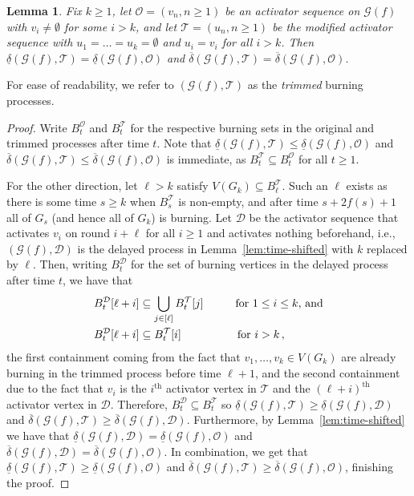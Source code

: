 \documentclass[12pt]{article}
\newtheorem{lemma}[theorem]{Lemma}
\theoremstyle{remark}
\newcommand\cD{\mathcal D}
\newcommand\cG{\mathcal G}
\newcommand\cO{\mathcal O}
\newcommand\cT{{\mathcal T}}
\newcommand{\ith}[1]{#1^{\text{th}}}
\begin{document}
\begin{lemma}\label{lem:turn1}
Fix $k \geq 1$, let $\cO = (v_n, n \geq 1)$ be an activator sequence on $\cG(f)$ with $v_i \ne \emptyset$ for some $i>k$, and let $\cT = (u_n, n \geq 1)$ be the modified activator sequence with $u_1 = \dots = u_k = \emptyset$ and $u_i = v_i$ for all $i > k$. Then $\underline{\delta}(\cG(f),\cT) = \underline{\delta}(\cG(f),\cO)$ and $\overline{\delta}(\cG(f),\cT) = \overline{\delta}(\cG(f),\cO)$.
\end{lemma}

For ease of readability, we refer to $(\cG(f), \cT)$ as the \emph{trimmed} burning processes.  

\begin{proof}
Write $B^{\cO}_t$ and $B^{\cT}_t$ for the respective burning sets in the original and trimmed processes after time $t$. Note that $\underline{\delta}(\cG(f),\cT) \leq \underline{\delta}(\cG(f),\cO)$ and $\overline{\delta}(\cG(f),\cT) \leq \overline{\delta}(\cG(f),\cO)$ is immediate, as $B^{\cT}_t \subseteq B^{\cO}_t$ for all $t \geq 1$. 

For the other direction, let $\ell > k$ satisfy $V(G_k) \subseteq B^{\cT}_\ell$. Such an $\ell$ exists as there is some time $s \geq k$ when $B^{\cT}_s$ is non-empty, and after time $s+2f(s)+1$ all of $G_s$ (and hence all of $G_k$) is burning. Let $\cD$ be the activator sequence that activates $v_i$ on round $i+\ell$ for all $i \geq 1$ and activates nothing beforehand, i.e., $(\cG(f), \cD)$ is the delayed process in Lemma~\ref{lem:time-shifted} with $k$ replaced by $\ell$. Then, writing $B^{\cD}_t$ for the set of burning vertices in the delayed process after time $t$, we have that 
\begin{align*}
B^{\cD}_t[\ell + i] &\subseteq \bigcup_{j \in [\ell]} B^{\cT}_t[j] \hspace{1cm} \text{for } 1 \leq i \leq k \text{, and} \\
B^{\cD}_t[\ell + i] &\subseteq B^{\cT}_{t}[i] \hspace{1.76cm} \text{for } i > k \,,
\end{align*}
the first containment coming from the fact that $v_1,\dots,v_k \in V(G_k)$ are already burning in the trimmed process before time $\ell+1$, and the second containment due to the fact that $v_i$ is the $\ith{i}$ activator vertex in $\cT$ and the $\ith{(\ell+i)}$ activator vertex in $\cD$. Therefore, $B^{\cD}_t \subseteq B^{\cT}_t$ so $\underline{\delta}(\cG(f),\cT) \ge \underline{\delta}(\cG(f), \cD)$ and $\overline{\delta}(\cG(f),\cT) \ge \overline{\delta}(\cG(f), \cD)$. Furthermore, by Lemma~\ref{lem:time-shifted} we have that $\underline{\delta}(\cG(f),\cD) = \underline{\delta}(\cG(f),\cO)$ and $\overline{\delta}(\cG(f),\cD) = \overline{\delta}(\cG(f),\cO)$. In combination, we get that $\underline{\delta}(\cG(f),\cT) \geq \underline{\delta}(\cG(f),\cO)$ and $\overline{\delta}(\cG(f),\cT) \geq \overline{\delta}(\cG(f),\cO)$, finishing the proof.
\end{proof}
\end{document}
